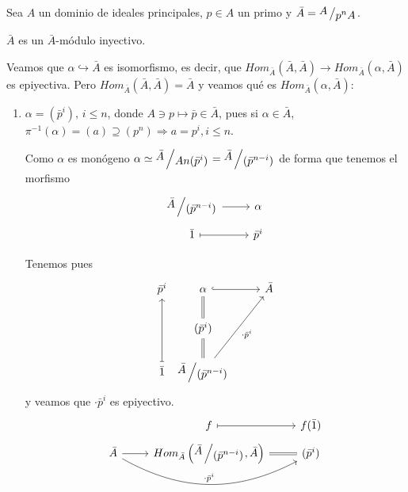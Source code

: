 \begin{teo}
    Sea $A$ un dominio de ideales principales, $p \in A$ un primo y $\bar A = \modulo{A}{p^n A}$. 

    $\bar A$ es un $\bar A$-m\'odulo inyectivo. 
\end{teo}
\begin{dem}
    Veamos que $\alpha \hookrightarrow \bar A$ es isomorfismo, es decir, que $Hom_{\bar A}(\bar A,\bar A) \longrightarrow Hom_{\bar A}(\alpha,\bar A)$ es epiyectiva. Pero $Hom_{\bar A}(\bar A,\bar A) = \bar A$ y veamos qu\'e es $Hom_{\bar A}(\alpha,\bar A)$:
    \begin{enumerate}
        \item $\alpha = (\bar p^i ), \, i \leq n$, donde $A \ni p \mapsto \bar p \in \bar A$, pues si $\alpha \in \bar A$, $\pi^{-1}(\alpha) = (a) \supseteq (p^n) \Rightarrow a = p^i, i \leq n$.  

        Como $\alpha$ es mon\'ogeno $\alpha \simeq \modulo{\bar A}{An(\bar p^i)} = \modulo{\bar A}{(\bar p^{n-i})}$ de forma que tenemos el morfismo 
         $$\bt \modulo{\bar A}{(\bar p^{n-i})} \rar & \alpha \\[-5mm] \bar 1 \rarmaps & \bar p^i \et$$

         Tenemos pues 
         $$\bt \bar p^i &[-8mm] \alpha \arrow[equal]{d} \arrow[hook]{r} & \bar A \\ &[-8mm] (\bar p^i)
          \arrow[equal]{d}  \\ 
          \bar 1 \arrow[mapsto]{uu} &[-8mm] \modulo{\bar A}{(\bar p^{n-i})} \arrow[swap]{ruu}{\cdot \bar p^i} \et$$
         y veamos que $\cdot \bar p^i$ es epiyectivo.
         $$\bt & f \rarmaps & f(\bar 1)  \\[-5mm] \bar A \rar \arrow[bend right=10mm]{rr}{\cdot \bar p^i} & Hom_{\bar A}\left( \modulo{\bar A}{(\bar p^{n-i})} , \bar A \right) & [-10mm] \arrow[equal]{l} (\bar p^i) \et$$
         
    \end{enumerate}
\end{dem}

